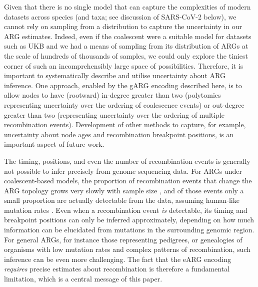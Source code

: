 \documentclass{article}
\begin{document}
Given that there is no single model that can capture the complexities
of modern datasets across species (and taxa; see discussion of SARS-CoV-2
below), we cannot rely on sampling from a distribution to capture
the uncertainty in our ARG estimates. Indeed, even if the coalescent
were a suitable model for datasets such as UKB and we had a means of
sampling from its distribution of ARGs at the scale of hundreds of thousands
of samples, we could only explore the tiniest corner of such an incomprehensibly
large space of possibilities.
Therefore, it is important to systematically
describe and utilise uncertainty about ARG inference.
One approach, enabled by the gARG encoding described here, is to allow
nodes to have (rootward) in-degree greater than two (polytomies
representing uncertainty over the ordering of coalescence events) or
out-degree greater than two (representing uncertainty over the ordering
of multiple recombination events). Development of other methods to capture, for example,
uncertainty about node ages and recombination breakpoint positions, is an important
aspect of future work.

The timing, positions, and even the number of recombination events is generally
not possible to infer precisely from genome sequencing data. For ARGs under
coalescent-based models, the proportion of recombination events that change the
ARG topology grows very slowly with sample size \citep{hein2004gene}, and of those
events only a small proportion are actually detectable from the data, assuming
human-like mutation rates \citep{myers2002detection,hayman2023recoverability}.
Even when a recombination event \emph{is} detectable, its timing and breakpoint
positions can only be inferred approximately, depending on how much information
can be elucidated from mutations in the surrounding genomic region. For general
ARGs, for instance those representing pedigrees, or genealogies of organisms with
low mutation rates and complex patterns of recombination, such inference can be
even more challenging. The fact that the eARG encoding \emph{requires}
precise estimates about recombination is therefore a fundamental limitation, which
is a central message of this paper.
\end{document}
